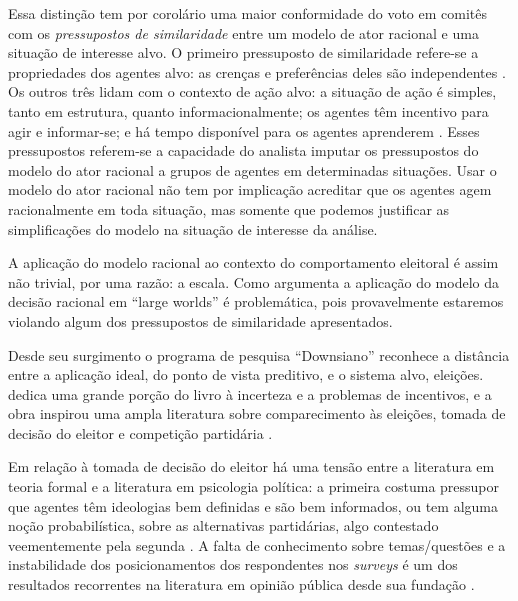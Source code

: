 Essa distinção tem por corolário uma maior conformidade do voto em comitês com
os \textit{pressupostos de similaridade} entre um modelo de ator racional e uma
situação de interesse alvo. O primeiro pressuposto de similaridade refere-se a
propriedades dos agentes alvo: as crenças e preferências deles são independentes
\cite{binmore2008rational}. Os outros três lidam com o contexto de ação alvo: a
situação de ação é simples, tanto em estrutura, quanto informacionalmente; os
agentes têm incentivo para agir e informar-se; e há tempo disponível para os
agentes aprenderem \cite{binmore2007work, page2008uncertainty}. Esses
pressupostos referem-se a capacidade do analista imputar os pressupostos do
modelo do ator racional a grupos de agentes em determinadas situações. Usar o
modelo do ator racional não tem por implicação acreditar que os agentes agem
racionalmente em toda situação, mas somente que podemos justificar as
simplificações do modelo na situação de interesse da análise.

A aplicação do modelo racional ao contexto do comportamento eleitoral é assim
não trivial, por uma razão: a escala. Como argumenta 
a aplicação do modelo da decisão racional em  ``large worlds'' é problemática,
pois provavelmente estaremos violando algum dos pressupostos de similaridade
apresentados.

Desde seu surgimento o programa de pesquisa ``Downsiano'' reconhece a distância
entre a aplicação ideal, do ponto de vista preditivo, e o sistema alvo,
eleições.  dedica uma grande porção do livro à
incerteza e a problemas de incentivos, e a obra inspirou uma ampla literatura
sobre comparecimento às eleições, tomada de decisão do eleitor e competição
partidária \cite{bendor2011behavioral}.

Em relação à tomada de decisão do eleitor há uma tensão entre a literatura em
teoria formal e a literatura em psicologia política: a primeira costuma
pressupor que agentes têm ideologias bem definidas e são bem informados, ou tem
alguma noção probabilística, sobre as alternativas partidárias, algo contestado
veementemente pela segunda \cite[p.5]{bendor2011behavioral}. A falta de
conhecimento sobre temas/questões e a instabilidade dos posicionamentos dos
respondentes nos \textit{surveys} é um dos resultados recorrentes na literatura
em opinião pública  desde sua fundação \cite{berelson1952democratic,
  converse2006nature, zaller1992simple, kuklinski2000misinformation}.

